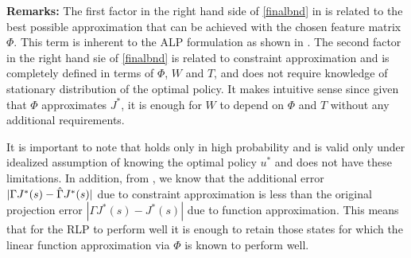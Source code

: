 \textbf{Remarks:}
The first factor in the right hand side of \eqref{finalbnd} in  is related to the best possible approximation that can be achieved with the chosen feature matrix $\Phi$. This term is inherent to the ALP formulation as shown in . The second factor in the right hand sie of \eqref{finalbnd} is related to constraint approximation and is completely defined in terms of $\Phi$, $W$ and $T$, and does not require knowledge of stationary distribution of the optimal policy. It makes intuitive sense since given that $\Phi$ approximates $J^*$, it is enough for $W$ to depend on $\Phi$ and $T$ without any additional requirements.\par
It is important to note that  holds only in high probability and is valid only under idealized assumption of knowing the optimal policy $u^*$ and  does not have these limitations.
In addition, from , we know that the additional error $|\Gamma J^*(s) -\hat{\Gamma} J^*(s)|$ due to constraint approximation is less than the original projection error $|\Gamma J^*(s)-J^*(s)|$ due to function approximation. This means that for the RLP to perform well it is enough to retain those states for which the linear function approximation via $\Phi$ is known to perform well.
\begin{comment}
\subsection{Open Questions}
Interestingly, the RLP has nevertheless been found to do well empirically in domain such as Tetris \cite{CST} and controlled queues \cite{CS} even when the constraints were sampled using distribution other than the ideal distribution. This fact indicates a gap in the theoretical analysis and points to the need for a more elaborate theory that addresses the issue of constraint approximation. In this paper, we answer the following questions related to constraint reduction in ALP that have so far remained open. \\
$\bullet$ As a natural generalization of the RLP, what happens if we define a generalized reduced linear program (GRLP) whose constraints are positive linear combinations of the original constraints of the ALP?\\
$\bullet$ Unlike \cite{CS} which provides error bounds for a specific RLP formulated using an idealized sampling distribution, is it possible to provide error bounds for any GRLP (and hence any RLP)?
In this paper, we address both of the questions above.
\end{comment}

